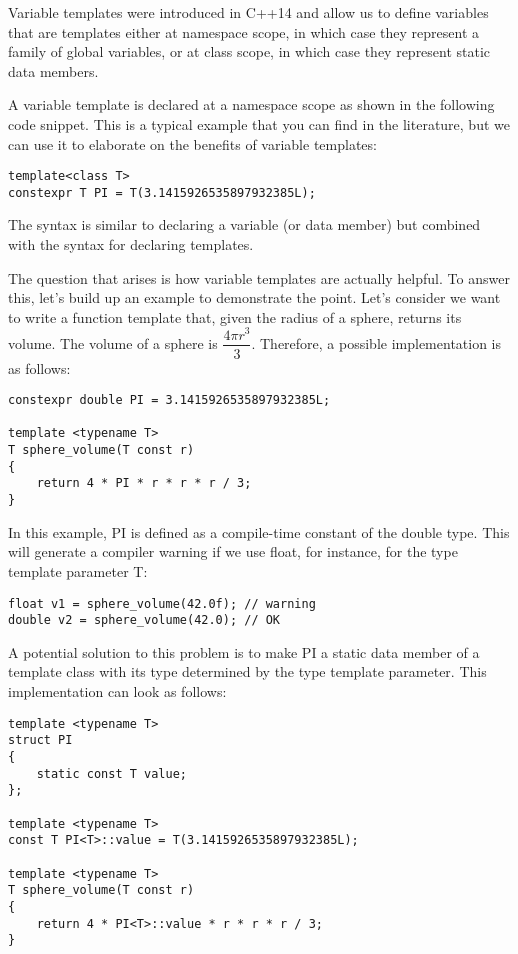 Variable templates were introduced in C++14 and allow us to define variables that are templates either at namespace scope, in which case they represent a family of global variables, or at class scope, in which case they represent static data members.

A variable template is declared at a namespace scope as shown in the following code snippet. This is a typical example that you can find in the literature, but we can use it to elaborate on the benefits of variable templates:

\begin{lstlisting}[style=styleCXX]
template<class T>
constexpr T PI = T(3.1415926535897932385L);
\end{lstlisting}

The syntax is similar to declaring a variable (or data member) but combined with the syntax for declaring templates.

The question that arises is how variable templates are actually helpful. To answer this, let's build up an example to demonstrate the point. Let's consider we want to write a function template that, given the radius of a sphere, returns its volume. The volume of a sphere is $\dfrac{4\pi r^{3}}{3}$. Therefore, a possible implementation is as follows:

\begin{lstlisting}[style=styleCXX]
constexpr double PI = 3.1415926535897932385L;

template <typename T>
T sphere_volume(T const r)
{
	return 4 * PI * r * r * r / 3;
}
\end{lstlisting}

In this example, PI is defined as a compile-time constant of the double type. This will generate a compiler warning if we use float, for instance, for the type template parameter T:

\begin{lstlisting}[style=styleCXX]
float v1 = sphere_volume(42.0f); // warning
double v2 = sphere_volume(42.0); // OK
\end{lstlisting}

A potential solution to this problem is to make PI a static data member of a template class with its type determined by the type template parameter. This implementation can look as follows:

\begin{lstlisting}[style=styleCXX]
template <typename T>
struct PI
{
	static const T value;
};

template <typename T>
const T PI<T>::value = T(3.1415926535897932385L);

template <typename T>
T sphere_volume(T const r)
{
	return 4 * PI<T>::value * r * r * r / 3;
}
\end{lstlisting}

